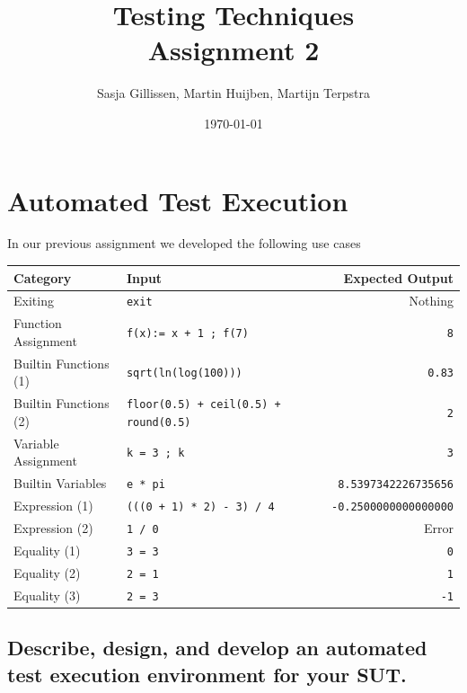 \documentclass[11pt,a4paper]{article}
\author{Sasja Gillissen, Martin Huijben, Martijn Terpstra}
\date{\today}
\title{Testing Techniques\\
  \textbf{Assignment 2}}
\begin{document}
\maketitle


\section{Automated Test Execution}

In our previous assignment we developed the following use cases

\begin{center}
\begin{tabular}{llr}
Category & Input & Expected Output\\
\hline
Exiting & \texttt{exit} & Nothing\\
Function Assignment & \texttt{f(x):= x + 1 ; f(7)} & \texttt{8}\\
Builtin Functions (1) & \texttt{sqrt(ln(log(100)))} & \texttt{0.83}\\
Builtin Functions (2) & \texttt{floor(0.5) + ceil(0.5) + round(0.5)} & \texttt{2}\\
Variable Assignment & \texttt{k = 3 ; k} & \texttt{3}\\
Builtin Variables & \texttt{e * pi} & \texttt{8.5397342226735656}\\
Expression (1) & \texttt{(((0 + 1) * 2) - 3) / 4} & \texttt{-0.2500000000000000}\\
Expression (2) & \texttt{1 / 0} & Error\\
Equality (1) & \texttt{3 = 3} & \texttt{0}\\
Equality (2) & \texttt{2 = 1} & \texttt{1}\\
Equality (3) & \texttt{2 = 3} & \texttt{-1}\\
\end{tabular}
\end{center}

\subsection{Describe, design, and develop an automated test execution environment for your SUT.}
\end{document}

